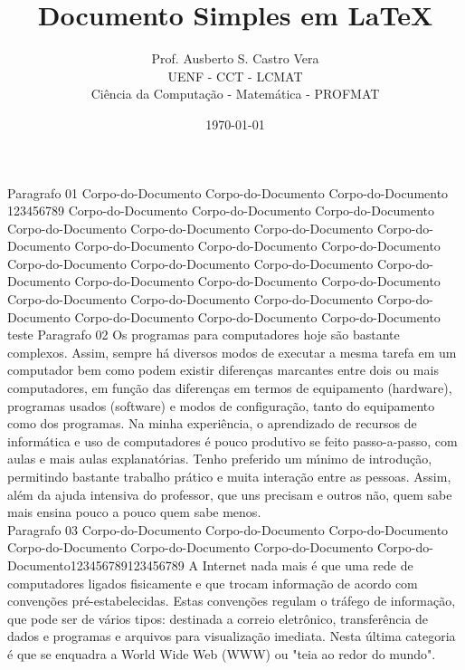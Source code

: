 \documentclass{article} %
\title{Documento Simples em LaTeX}
\author{Prof. Ausberto S. Castro Vera \\
	UENF - CCT - LCMAT \\
Ci\^{e}ncia da Computa\c{c}\~{a}o - Matem\'{a}tica - PROFMAT %
}
\date{\today}    %
\begin{document}
\maketitle     %

Paragrafo 01
Corpo-do-Documento Corpo-do-Documento Corpo-do-Documento 123456789 Corpo-do-Documento Corpo-do-Documento Corpo-do-Documento
Corpo-do-Documento Corpo-do-Documento Corpo-do-Documento
Corpo-do-Documento Corpo-do-Documento Corpo-do-Documento
Corpo-do-Documento Corpo-do-Documento Corpo-do-Documento
Corpo-do-Documento Corpo-do-Documento Corpo-do-Documento
Corpo-do-Documento Corpo-do-Documento Corpo-do-Documento
Corpo-do-Documento Corpo-do-Documento Corpo-do-Documento
Corpo-do-Documento Corpo-do-Documento Corpo-do-Documento\\
teste
Paragrafo 02
Os programas para computadores hoje s\~{a}o bastante complexos. Assim, sempre h\'{a} diversos modos de executar a mesma tarefa em um computador bem como podem existir diferen\c{c}as marcantes entre dois ou mais computadores, em fun\c{c}\~{a}o das diferen\c{c}as em termos de equipamento (hardware), programas usados (software) e modos de configura\c{c}\~{a}o, tanto do equipamento como dos programas.
Na minha experi\^{e}ncia, o aprendizado de recursos de inform\'{a}tica e uso de computadores \'{e} pouco produtivo se feito passo-a-passo, com aulas e mais aulas explanat\'{o}rias. Tenho preferido um m\'{\i}nimo de introdu\c{c}\~{a}o, permitindo bastante trabalho pr\'{a}tico e muita intera\c{c}\~{a}o entre as pessoas. Assim, al\'{e}m da ajuda intensiva do professor, que uns precisam e outros n\~{a}o, quem sabe mais ensina pouco a pouco quem sabe menos.\\


Paragrafo 03
Corpo-do-Documento
Corpo-do-Documento
Corpo-do-Documento
Corpo-do-Documento
Corpo-do-Documento
Corpo-do-Documento
Corpo-do-Documento123456789123456789
A Internet nada mais \'{e} que uma rede de computadores ligados fisicamente e que trocam informa\c{c}\~{a}o de acordo com conven\c{c}\~{o}es pr\'{e}-estabelecidas. Estas conven\c{c}\~{o}es regulam o tr\'{a}fego de informa\c{c}\~{a}o, que pode ser de v\'{a}rios tipos: destinada a correio eletr\^{o}nico, transfer\^{e}ncia de dados e programas e arquivos para visualiza\c{c}\~{a}o imediata. Nesta \'{u}ltima categoria \'{e} que se enquadra a World Wide Web (WWW) ou "teia ao redor do mundo".
\end{document}
